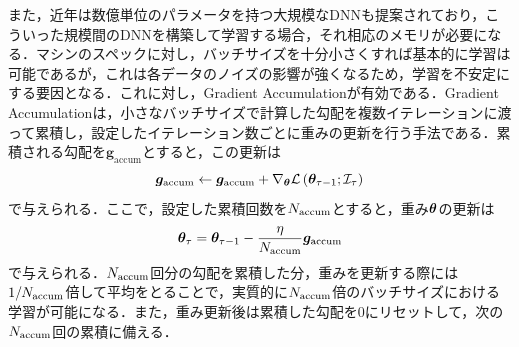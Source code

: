 また，近年は数億単位のパラメータを持つ大規模なDNNも提案されており，こういった規模間のDNNを構築して学習する場合，それ相応のメモリが必要になる．マシンのスペックに対し，バッチサイズを十分小さくすれば基本的に学習は可能であるが，これは各データのノイズの影響が強くなるため，学習を不安定にする要因となる．これに対し，Gradient Accumulationが有効である．Gradient Accumulationは，小さなバッチサイズで計算した勾配を複数イテレーションに渡って累積し，設定したイテレーション数ごとに重みの更新を行う手法である．累積される勾配を$\bm{g}_{\text{accum}}$とすると，この更新は
\begin{equation}
    \bm{g}_{\text{accum}} \gets \bm{g}_{\text{accum}} + \nabla_{\bm{\theta}} \mathcal{L}\left(\bm{\theta}_{\tau - 1}; \mathcal{I}_{\tau}\right)
\end{equation}
で与えられる．ここで，設定した累積回数を$N_{\text{accum}}$とすると，重み$\bm{\theta}$の更新は
\begin{equation}
    \bm{\theta}_{\tau} = \bm{\theta}_{\tau - 1} - \frac{\eta}{N_{\text{accum}}} \bm{g}_{\text{accum}}
\end{equation}
で与えられる．$N_{\text{accum}}$回分の勾配を累積した分，重みを更新する際には$1 / N_{\text{accum}}$倍して平均をとることで，実質的に$N_{\text{accum}}$倍のバッチサイズにおける学習が可能になる．また，重み更新後は累積した勾配を0にリセットして，次の$N_{\text{accum}}$回の累積に備える．


